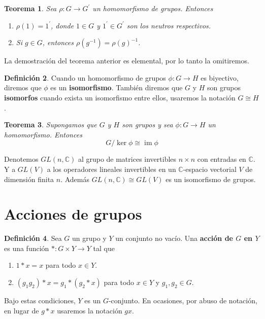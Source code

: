 \documentclass[12pt]{book}
\newtheorem{theorem}{Teorema}[section]
\theoremstyle{definition}
\newtheorem{definition}[theorem]{Definición}
\DeclareMathOperator{\im}{im}
\newcounter{in}
\newcounter{ini}
\begin{document}
{\begin{theorem}
  Sea $\rho:G\rightarrow G^{'}$ un homomorfismo de grupos. Entonces
  \begin{enumerate}
    \item $\rho(1)=1^{'}$, donde $1\in G$ y  $1^{'}\in G^{'}$ son los
    neutros respectivos. 
    \item Si $g\in G$, entonces $\rho(g^{-1})=\rho (g)^{-1}$.
  \end{enumerate}
\end{theorem}

La demostración del teorema anterior es elemental, por lo tanto la omitiremos.

\begin{definition}
  Cuando un homomorfismo de grupos $\phi:G\rightarrow H$ es biyectivo,
  diremos que $\phi$ es un  \textbf{isomorfismo}. También diremos que
  $G$ y $H$ son grupos  \textbf{isomorfos} cuando exista un
    isomorfismo entre ellos, usaremos la notación $G\cong H$.
\end{definition}

\begin{theorem}
  Supongamos que $G$ y $H$ son grupos y sea $\phi:G\rightarrow H$ un
  homomorfismo. Entonces $$G/\ker \phi\cong \im \phi$$ 
\end{theorem}

  Denotemos $GL(n,\mathbb{C})$ al grupo de matrices
  invertibles  $n \times n$ con entradas en $\mathbb{C}$.  
  Y a $GL(V)$ a los operadores lineales invertibles en un
  $\mathbb{C}$-espacio vectorial $V$ de dimensión finita $n$.
  Además $GL(n,\mathbb{C})\cong GL(V)$ es un isomorfismo de grupos.

\section{Acciones de grupos}

\begin{definition}
  Sea $G$ un grupo y $Y$ un conjunto no vacío. Una  \textbf{acción de $G$
  en $Y$} es una función $*:G \times Y \rightarrow Y$ tal que
\begin{enumerate}
\item $1*x=x$ para todo $x\in Y.$
\item $(g_{1}g_{2})*x=g_{1}*(g_{2}*x)$ para todo $x\in Y$ y $g_{1},g_{2}\in G.$
\end{enumerate}
   Bajo estas condiciones, $Y$ es un $G$-conjunto. En ocasiones, por
   abuso de notación, en lugar de $g*x$ usaremos la notación $gx.$
\end{definition}

}
\end{document}
